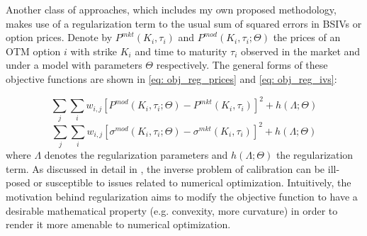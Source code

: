 \documentclass[12pt]{article}
\begin{document}
Another class of approaches, which includes my own proposed methodology, makes use of a regularization term to the usual sum of squared errors in BSIVs or option prices. Denote by $P^{mkt}(K_i, \tau_i)$ and $P^{mod}(K_i, \tau_i; \Theta) $ the prices of an OTM option $i$ with strike $K_i$ and time to maturity $\tau_i$ observed in the market and under a model with parameters $\Theta$ respectively. The general forms of these objective functions are shown in \eqref{eq: obj_reg_prices} and \eqref{eq: obj_reg_ivs}:

\begin{equation}\label{eq: obj_reg_prices}
       \sum\limits_j \sum\limits_{i} w_{i,j}\left[P^{mod}(K_i, \tau_i ; \Theta) - P^{mkt}(K_i, \tau_i)\right]^2 + h(\Lambda; \Theta)
\end{equation}
\begin{equation}\label{eq: obj_reg_ivs}
       \sum\limits_j   \sum\limits_{i} w_{i,j}\left[\sigma^{mod}(K_i, \tau_i; \Theta) - \sigma^{mkt}(K_i, \tau_i)\right]^2 + h(\Lambda;\Theta)
\end{equation}
where $\Lambda$ denotes the regularization parameters and $h(\Lambda;\Theta)$ the regularization term. As discussed in detail in \cite{cont2003financial}, the inverse problem of calibration can be ill-posed or susceptible to issues related to numerical optimization. Intuitively, the motivation behind regularization aims to modify the objective function to have a desirable mathematical property (e.g. convexity, more curvature) in order to render it more amenable to numerical optimization. 
\end{document}
